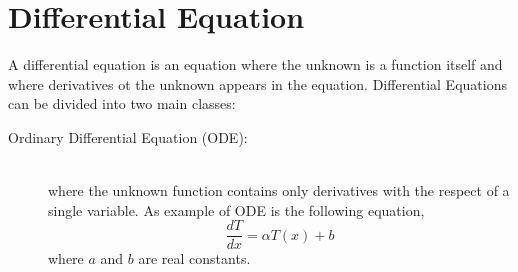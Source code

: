 \section{Differential Equation}
A differential equation\cite{Larsoon:2004,Mcowen:2002} is an equation where the unknown is a function itself and where derivatives ot the unknown appears in the equation.
Differential Equations can be divided into two main classes:
\begin{description}
\item[Ordinary Differential Equation (ODE):] \hfil \\ where the unknown function contains only derivatives with the respect of a single variable. As example of ODE is the following equation,
\[
  \frac{d T}{d x} = \alpha T(x) +b
\] where $a$ and $b$ are real constants.


\end{description}
